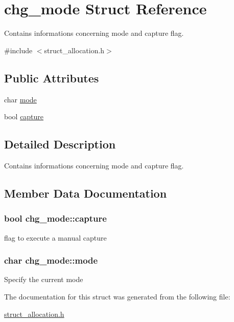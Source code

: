 \hypertarget{structchg__mode}{}\section{chg\+\_\+mode Struct Reference}
\label{structchg__mode}


Contains informations concerning mode and capture flag.  




{\ttfamily \#include $<$struct\+\_\+allocation.\+h$>$}

\subsection*{Public Attributes}
\begin{DoxyCompactItemize}
\item 
char \hyperlink{structchg__mode_a600445f8ca0e6694977b9576e8fd117c}{mode}
\item 
bool \hyperlink{structchg__mode_aeab17919a48b994cb388f312424f1fc5}{capture}
\end{DoxyCompactItemize}


\subsection{Detailed Description}
Contains informations concerning mode and capture flag. 

\subsection{Member Data Documentation}
\subsubsection[{\texorpdfstring{capture}{capture}}]{\setlength{\rightskip}{0pt plus 5cm}bool chg\+\_\+mode\+::capture}\hypertarget{structchg__mode_aeab17919a48b994cb388f312424f1fc5}{}\label{structchg__mode_aeab17919a48b994cb388f312424f1fc5}
flag to execute a manual capture 
\subsubsection[{\texorpdfstring{mode}{mode}}]{\setlength{\rightskip}{0pt plus 5cm}char chg\+\_\+mode\+::mode}\hypertarget{structchg__mode_a600445f8ca0e6694977b9576e8fd117c}{}\label{structchg__mode_a600445f8ca0e6694977b9576e8fd117c}
Specify the current mode 

The documentation for this struct was generated from the following file\+:\begin{DoxyCompactItemize}
\item 
\hyperlink{struct__allocation_8h}{struct\+\_\+allocation.\+h}\end{DoxyCompactItemize}
